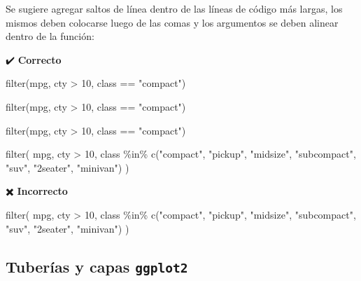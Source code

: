 \documentclass[
  spanish,
  letterpaper,
  DIV=11,
  numbers=noendperiod]{scrreprt}
\newenvironment{Shaded}{\begin{snugshade}}{\end{snugshade}}
\newcommand{\DecValTok}[1]{\textcolor[rgb]{0.68,0.00,0.00}{#1}}
\newcommand{\FunctionTok}[1]{\textcolor[rgb]{0.28,0.35,0.67}{#1}}
\newcommand{\NormalTok}[1]{\textcolor[rgb]{0.00,0.23,0.31}{#1}}
\newcommand{\SpecialCharTok}[1]{\textcolor[rgb]{0.37,0.37,0.37}{#1}}
\newcommand{\StringTok}[1]{\textcolor[rgb]{0.13,0.47,0.30}{#1}}
\begin{document}
Se sugiere agregar saltos de línea dentro de las líneas de código más
largas, los mismos deben colocarse luego de las comas y los argumentos
se deben alinear dentro de la función:

✔️ \textbf{Correcto}

\begin{Shaded}
\begin{Highlighting}[]
\FunctionTok{filter}\NormalTok{(mpg, cty }\SpecialCharTok{\textgreater{}} \DecValTok{10}\NormalTok{, class }\SpecialCharTok{==} \StringTok{"compact"}\NormalTok{)}


\FunctionTok{filter}\NormalTok{(mpg, cty }\SpecialCharTok{\textgreater{}} \DecValTok{10}\NormalTok{, class }\SpecialCharTok{==} \StringTok{"compact"}\NormalTok{)}


\FunctionTok{filter}\NormalTok{(mpg, cty }\SpecialCharTok{\textgreater{}} \DecValTok{10}\NormalTok{, class }\SpecialCharTok{==} \StringTok{"compact"}\NormalTok{)}

\FunctionTok{filter}\NormalTok{(}
\NormalTok{  mpg,}
\NormalTok{  cty }\SpecialCharTok{\textgreater{}} \DecValTok{10}\NormalTok{,}
\NormalTok{  class }\SpecialCharTok{\%in\%}
    \FunctionTok{c}\NormalTok{(}\StringTok{"compact"}\NormalTok{, }\StringTok{"pickup"}\NormalTok{, }\StringTok{"midsize"}\NormalTok{, }\StringTok{"subcompact"}\NormalTok{, }\StringTok{"suv"}\NormalTok{, }\StringTok{"2seater"}\NormalTok{, }\StringTok{"minivan"}\NormalTok{)}
\NormalTok{)}
\end{Highlighting}
\end{Shaded}

✖️ \textbf{Incorrecto}

\begin{Shaded}
\begin{Highlighting}[]
\FunctionTok{filter}\NormalTok{(}
\NormalTok{  mpg,}
\NormalTok{  cty }\SpecialCharTok{\textgreater{}} \DecValTok{10}\NormalTok{,}
\NormalTok{  class }\SpecialCharTok{\%in\%}
    \FunctionTok{c}\NormalTok{(}\StringTok{"compact"}\NormalTok{, }\StringTok{"pickup"}\NormalTok{, }\StringTok{"midsize"}\NormalTok{, }\StringTok{"subcompact"}\NormalTok{, }\StringTok{"suv"}\NormalTok{, }\StringTok{"2seater"}\NormalTok{, }\StringTok{"minivan"}\NormalTok{)}
\NormalTok{)}
\end{Highlighting}
\end{Shaded}

\subsection{\texorpdfstring{Tuberías y capas
\texttt{ggplot2}}{Tuberías y capas ggplot2}}\label{tuberuxedas-y-capas-ggplot2}
\end{document}
